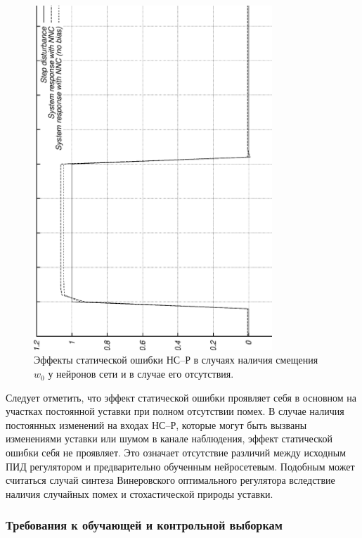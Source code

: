 \begin{figure}[h]
\centering
\includegraphics[angle=270,width=0.8\textwidth,%
             totalheight=0.35\textheight]{npc_nob_step_test}
\caption{Эффекты статической ошибки НС--Р в случаях наличия смещения $w_0$ у
         нейронов сети и в случае его отсутствия.}
\label{fig:npc_static_error}
\end{figure}

Следует отметить, что эффект статической ошибки проявляет себя в
основном на участках постоянной уставки при полном отсутствии помех.
В случае наличия постоянных изменений на входах НС--Р, которые могут
быть вызваны изменениями уставки или шумом в канале наблюдения, эффект
статической ошибки себя не проявляет.  Это означает отсутствие
различий между исходным ПИД регулятором и предварительно обученным
нейросетевым.  Подобным может считаться случай синтеза Винеровского
оптимального регулятора вследствие наличия случайных помех и
стохастической природы уставки.

\subsubsection{Требования к обучающей и контрольной выборкам}

